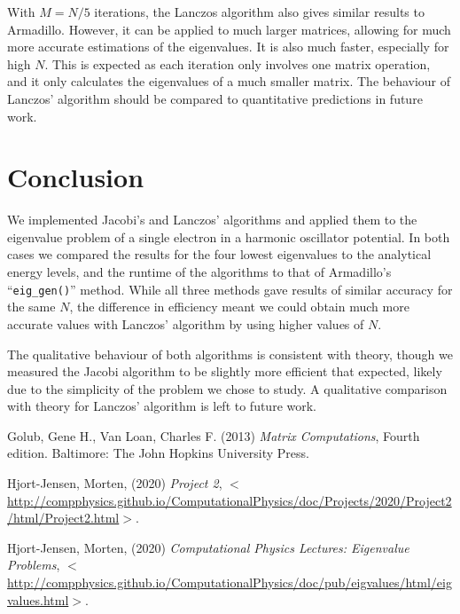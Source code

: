 \documentclass[a4paper,10pt,twocolumn]{article}
\begin{document}

With $M=N/5$ iterations, the Lanczos algorithm also gives similar results to Armadillo. However, it can be applied to much larger matrices, allowing for much more accurate estimations of the eigenvalues. It is also much faster, especially for high $N$. This is expected as each iteration only involves one matrix operation, and it only calculates the eigenvalues of a much smaller matrix. The behaviour of Lanczos' algorithm should be compared to quantitative predictions in future work.     

%
%
%
\section*{Conclusion}
We implemented Jacobi's and Lanczos' algorithms and applied them to the eigenvalue problem of a single electron in a harmonic oscillator potential. In both cases we compared the results for the four lowest eigenvalues to the analytical energy levels, and the runtime of the algorithms to that of Armadillo's ``\texttt{eig\_gen()}'' method. While all three methods gave results of similar accuracy for the same $N$, the difference in efficiency meant we could obtain much more accurate values with Lanczos' algorithm by using higher values of $N$.
  
The qualitative behaviour of both algorithms is consistent with theory, though we measured the Jacobi algorithm to be slightly more efficient that expected, likely due to the simplicity of the problem we chose to study. A qualitative comparison with theory for  Lanczos' algorithm is left to future work.



\onecolumn
\begin{thebibliography}{9}

Golub, Gene H., Van Loan, Charles F. (2013) \textit{Matrix Computations}, Fourth edition. Baltimore: The John Hopkins University Press.   

Hjort-Jensen, Morten, (2020) \textit{Project 2}, $<$\url{http://compphysics.github.io/ComputationalPhysics/doc/Projects/2020/Project2/html/Project2.html}$>$. 

Hjort-Jensen, Morten, (2020) \textit{Computational Physics Lectures: Eigenvalue Problems}, $<$\url{http://compphysics.github.io/ComputationalPhysics/doc/pub/eigvalues/html/eigvalues.html}$>$. 


\end{thebibliography}



\end{document}
